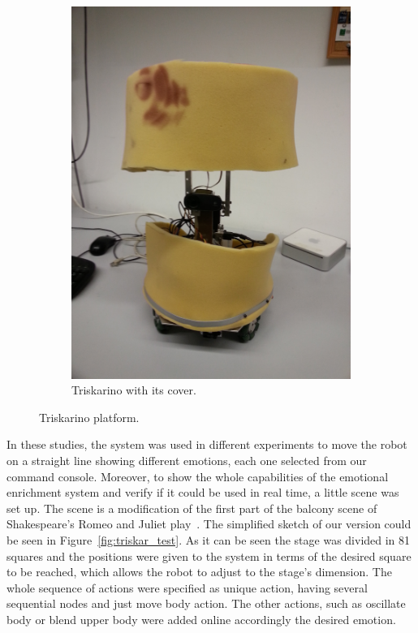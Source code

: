 \begin{figure}
\begin{subfigure}[c]{0.2\textwidth}
	\includegraphics[width=\textwidth]{./Images/platform_fome.jpg}
	\caption{Triskarino with its cover.}
	\label{fig:triskar}
	\end{subfigure}
	\caption{Triskarino platform.}
	\label{fig:robot}
\end{figure}  
 In these studies, the system was used in different experiments to move the robot on a straight line showing different emotions, each one selected from our command console. Moreover, to show the whole capabilities of the emotional enrichment system and verify if it could be used in real time, a little scene was set up. The scene is a modification of the first part of the balcony scene of Shakespeare's Romeo and Juliet play~\cite{RAndJ}. The simplified sketch of our version could be seen in Figure~\ref{fig:triskar_test}. As it can be seen the stage was divided in 81 squares and the positions were given to the system in terms of the desired square to be reached, which allows the robot to adjust to the stage's dimension.
The whole sequence of actions were specified as unique action, having several sequential nodes and just move body action. The other actions, such as oscillate body or blend upper body were added online accordingly the desired emotion. 
